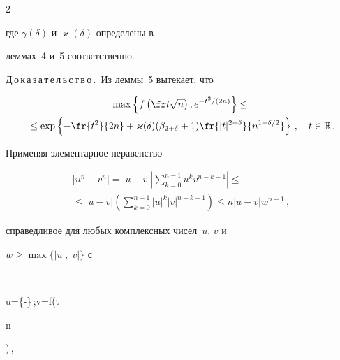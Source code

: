 \begin{multicols}{2}
{%








где $\gamma(\delta)$ и $\varkappa(\delta)$ определены в


леммах~4 и~5 соответственно.


}





\smallskip





\noindent


Д\,о\,к\,а\,з\,а\,т\,е\,л\,ь\,с\,т\,в\,о\,.\ Из леммы~5 вытекает, что


\begin{multline*}


\max\left\{f\left(\fr t{\sqrt n}\right),e^{-t^2/(2n)}\right\}\le{}\\


{}\le


\exp\left\{-\fr{t^2}{2n}+


\varkappa(\delta)(\bet+1)\fr{|t|^{2+\delta}}{n^{1+\delta/2}} \right\}\,,\quad


t\in\R\,.


\end{multline*}


Применяя элементарное неравенство


\begin{multline*}


\left|u^n-v^n\right|= |u-v|\left \vert


\sum\limits_{k=0}^{n-1}{u^kv^{n-k-1}}\right \vert


\le{}\\


{}\le |u-v|\left(\sum\limits_{k=0}^{n-1}|u|^k|v|^{n-k-1}\right)\le


n|u-v|w^{n-1}\,,


\end{multline*}


справедливое для любых комплексных чисел~$u$, $v$ и


$w\ge\max\{|u|,|v|\}$ с


$$


u=\exp\left\{-\right\}\,;\quad v=f\left(\fr t{\sqrt


n}\right)\,,



\end{multicols}
